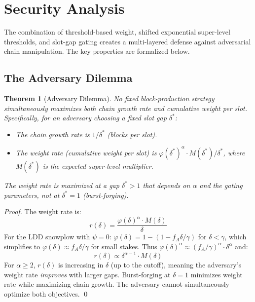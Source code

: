 \documentclass[11pt]{article}
\newtheorem{theorem}{Theorem}
\newcommand{\threshold}{\varphi}
\begin{document}
\section{Security Analysis}
\label{sec:security}

The combination of threshold-based weight, shifted exponential super-level thresholds, and slot-gap gating creates a multi-layered defense against adversarial chain manipulation. The key properties are formalized below.

\subsection{The Adversary Dilemma}

\begin{theorem}[Adversary Dilemma]
\label{thm:dilemma}
No fixed block-production strategy simultaneously maximizes both chain growth rate and cumulative weight per slot. Specifically, for an adversary choosing a fixed slot gap $\delta^*$:
\begin{itemize}
    \item The chain growth rate is $1/\delta^*$ (blocks per slot).
    \item The weight rate (cumulative weight per slot) is $\threshold(\delta^*)^\alpha \cdot M(\delta^*) / \delta^*$, where $M(\delta^*)$ is the expected super-level multiplier.
\end{itemize}
The weight rate is maximized at a gap $\delta^* > 1$ that depends on $\alpha$ and the gating parameters, not at $\delta^* = 1$ (burst-forging).
\end{theorem}

\begin{proof}
The weight rate is:
\[
r(\delta) = \frac{\threshold(\delta)^\alpha \cdot M(\delta)}{\delta}
\]
For the LDD snowplow with $\psi = 0$: $\threshold(\delta) = 1 - (1 - f_A \delta / \gamma)$ for $\delta < \gamma$, which simplifies to $\threshold(\delta) \approx f_A \delta / \gamma$ for small stakes. Thus $\threshold(\delta)^\alpha \approx (f_A/\gamma)^\alpha \cdot \delta^\alpha$ and:
\[
r(\delta) \propto \delta^{\alpha - 1} \cdot M(\delta)
\]
For $\alpha \geq 2$, $r(\delta)$ is increasing in $\delta$ (up to the cutoff), meaning the adversary's weight rate \emph{improves} with larger gaps. Burst-forging at $\delta = 1$ minimizes weight rate while maximizing chain growth. The adversary cannot simultaneously optimize both objectives. \qed
\end{proof}
\end{document}
